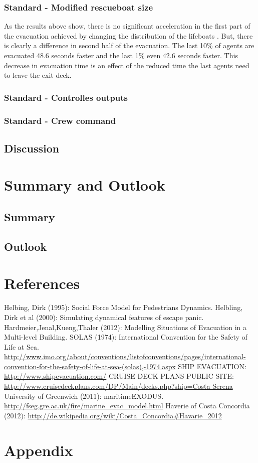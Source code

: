 \documentclass[11pt]{article}
\begin{document}
\subsubsection{Standard - Modified rescueboat size}

As the results above show, there is no significant acceleration in the first part of the evacuation achieved by changing the distribution of the lifeboats .  
 But, there is clearly a difference in second half of the evacuation. The last 10\% of agents are evacuated 48.6 seconds faster and the last 1\% even 42.6 seconds faster. 
This decrease in evacuation time is an effect of the reduced time the last agents need to leave the exit-deck.

\subsubsection{Standard - Controlles outputs}
\subsubsection{Standard - Crew command}
\subsection{Discussion}
\section{Summary and Outlook}
\subsection{Summary}
\subsection{Outlook}
\section{References}

\begin{thebibliography}{9}
 Helbing, Dirk (1995): Social Force Model for Pedestrians Dynamics.
 Helbling, Dirk et al (2000): Simulating dynamical features of escape panic.
 Hardmeier,Jenal,Kueng,Thaler (2012): Modelling Situations of Evacuation in a Multi-level Building.
 SOLAS (1974): International Convention for the Safety of Life at Sea. \url{http://www.imo.org/about/conventions/listofconventions/pages/international-convention-for-the-safety-of-life-at-sea-(solas),-1974.aspx}
 SHIP EVACUATION: \url{http://www.shipevacuation.com/}
 CRUISE DECK PLANS PUBLIC SITE: \url{http://www.cruisedeckplans.com/DP/Main/decks.php?ship=Costa Serena}
 University of Greenwich (2011):  maritimeEXODUS. \url{http://fseg.gre.ac.uk/fire/marine_evac_model.html}
 Haverie of Costa Concordia (2012): \url{http://de.wikipedia.org/wiki/Costa_Concordia#Havarie_2012}
	
\end{thebibliography}
\section{Appendix}
\end{document}
